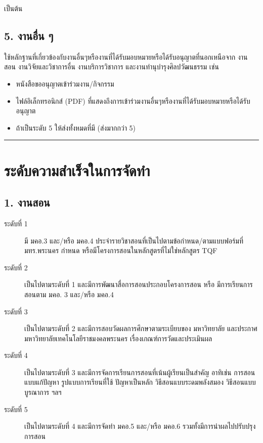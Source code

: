 \documentclass[a4paper,12pt,english]{sphinxmanual}
\begin{document}
เป็นต้น


\subsection{5. งานอื่น ๆ}
\label{\detokenize{submission_part1:id9}}
ใช้หลักฐานที่เกี่ยวข้องกับงานอื่นๆหรืองานที่ได้รับมอบหมายหรือได้รับอนุญาตที่นอกเหนือจาก งานสอน งานวิจัยและวิชาการอื่น งานบริการวิชาการ และงานทำนุบำรุงศิลปวัฒนธรรม เช่น
\begin{itemize}
\item {} 
หนังสือขออนุญาตเข้าร่วมงาน/กิจกรรม

\item {} 
ไฟล์อิเล็กทรอนิกส์ (PDF) ที่แสดงถึงการเข้าร่วมงานอื่นๆหรืองานที่ได้รับมอบหมายหรือได้รับอนุญาต

\item {} 
ถ้าเป็นระดับ 5 ให้ส่งทั้งหมดที่มี (ส่งมากกว่า 5)

\end{itemize}


\bigskip\hrule\bigskip



\section{ระดับความสำเร็จในการจัดทำ}
\label{\detokenize{submission_part1:id10}}

\subsection{1. งานสอน}
\label{\detokenize{submission_part1:id11}}\begin{description}
\item[{ระดับที่ 1}] \leavevmode
มี มคอ.3 และ/หรือ มคอ.4 ประจำรายวิชาสอนที่เป็นไปตามข้อกำหนด/ตามแบบฟอร์มที่ มทร.พระนคร กำหนด หรือมีโครงการสอนในหลักสูตรที่ไม่ใช่หลักสูตร TQF

\item[{ระดับที่ 2}] \leavevmode
เป็นไปตามระดับที่ 1 และมีการพัฒนาสื่อการสอนประกอบโครงการสอน หรือ มีการเรียนการสอนตาม มคอ. 3 และ/หรือ มคอ.4

\item[{ระดับที่ 3}] \leavevmode
เป็นไปตามระดับที่ 2 และมีการสอบวัดผลการศึกษาตามระเบียบของ มหาวิทยาลัย และประกาศมหาวิทยาลัยเทคโนโลยีราชมงคลพระนคร เรื่องเกณฑ์การวัดและประเมินผล

\item[{ระดับที่ 4}] \leavevmode
เป็นไปตามระดับที่ 3  และมีการจัดการเรียนการสอนที่เน้นผู้เรียนเป็นสำคัญ อาทิเช่น การสอนแบบแก้ปัญหา รูปแบบการเรียนที่ใช้
ปัญหาเป็นหลัก วิธีสอนแบบระดมพลังสมอง วิธีสอนแบบบูรณาการ ฯลฯ

\item[{ระดับที่ 5}] \leavevmode
เป็นไปตามระดับที่ 4 และมีการจัดทำ มคอ.5 และ/หรือ มคอ.6 รวมทั้งมีการนำผลไปปรับปรุงการสอน

\end{description}
\end{document}
